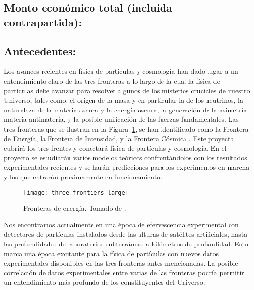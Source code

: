 \subsection{Monto económico total (incluida contrapartida):}
\subsection{Antecedentes:                                  }
Los avances recientes en física de partículas y cosmología han dado
lugar a un entendimiento claro de las tres fronteras a lo largo de la
cual la física de partículas debe avanzar para resolver algunos de los
misterios cruciales de nuestro Universo, tales como: el origen de la
masa y en particular la de los neutrinos, la naturaleza de la
materia oscura y la energía oscura, la generación de la asimetría
materia-antimateria, y la posible unificación de las fuerzas fundamentales. Las tres
fronteras que se ilustran en la Figura~\ref{fig:1}, se han
identificado como la Frontera de Energía, la Frontera de Intensidad, y
la Frontera Cósmica \cite{fermilab}. Este proyecto cubrirá los tres
frentes y conectará física de partículas y cosmología. En el proyecto
se estudiarán varios modelos teóricos confrontándolos con los
resultados experimentales recientes y se harán predicciones para los
experimentos en marcha y los que entrarán próximamente en
funcionamiento.

\begin{figure}
  \centering
\texttt{[image: three-frontiers-large]}
  \caption{Fronteras de energía. Tomado de \cite{fermilab}.}
  \label{fig:1}
\end{figure}

Nos encontramos actualmente en una época de efervescencia experimental con
detectores de partículas instalados desde las alturas de satélites
artificiales, hasta las profundidades de laboratorios subterráneos a
kilómetros de profundidad. Esto marca una época excitante para la
física de partículas con nuevos datos experimentales disponibles en
las tres fronteras antes mencionadas. La posible correlación de datos
experimentales entre varias de las fronteras podría permitir un
entendimiento más profundo de los constituyentes del Universo.

